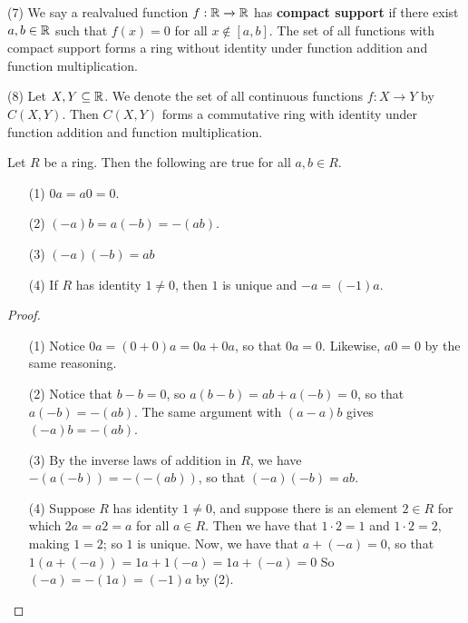\begin{example}
\item[(7)] We say a realvalued function $f:\mathbb{R} \xrightarrow{} \mathbb{R}$ has
  \textbf{compact support} if there exist $a,b \in \mathbb{R}$ such that $f(x)=0$
  for all $x \notin [a,b]$. The set of all functions with compact support
  forms a ring without identity under function addition and function
  multiplication.

\item[(8)] Let $X,Y \subseteq \mathbb{R}$. We denote the set of all continuous
  functions  $f:X \xrightarrow{} Y$ by $C(X,Y)$. Then $C(X,Y)$ forms a
  commutative ring with identity under function addition and function
  multiplication.
\end{example}

\begin{lemma}\label{1.1.1}
  Let $R$ be a ring. Then the following are true for all  $a,b \in R$.
  \begin{enumerate}
    \item[(1)] $0a=a0=0$.

    \item[(2)] $(-a)b=a(-b)=-(ab)$.

    \item[(3)] $(-a)(-b)=ab$

    \item[(4)] If $R$ has identity  $1 \neq 0$, then $1$ is unique and
      $-a=(-1)a$.
  \end{enumerate}
\end{lemma}
\begin{proof}
  \begin{enumerate}
    \item[(1)] Notice $0a=(0+0)a=0a+0a$, so that $0a=0$. Likewise, $a0=0$ by
      the same reasoning.

    \item[(2)] Notice that $b-b=0$, so $a(b-b)=ab+a(-b)=0$, so that
      $a(-b)=-(ab)$. The same argument with $(a-a)b$ gives $(-a)b=-(ab)$.

    \item[(3)] By the inverse laws of addition in $R$, we have
      $-(a(-b))=-(-(ab))$, so that $(-a)(-b)=ab$.

    \item[(4)] Suppose $R$ has identity $1 \neq 0$, and suppose there is an
      element $2 \in R$ for which  $2a=a2=a$ for all $a \in R$. Then we have
      that $1 \cdot 2=1$ and  $1 \cdot 2=2$, making  $1=2$; so  $1$ is unique.
      Now, we have that $a+(-a)=0$, so that $1(a+(-a))=1a+1(-a)=1a+(-a)=0$ So
      $(-a)=-(1a)=(-1)a$ by (2).
  \end{enumerate}
\end{proof}

